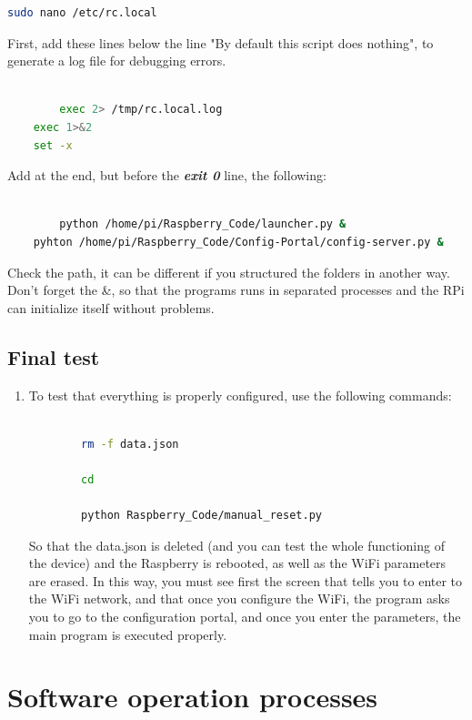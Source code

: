 \documentclass[12pt,a4paper,oneside]{article} %
\begin{document}
\begin{enumerate}
\begin{lstlisting}[language=sh]
		sudo nano /etc/rc.local 
	\end{lstlisting}
	
	First, add these lines below the line "By default this script does nothing", to generate a log file for debugging errors.
	\begin{lstlisting}[language=sh,style = textstyle]
	
		exec 2> /tmp/rc.local.log  
    exec 1>&2                  
    set -x  
	\end{lstlisting}
	
	Add at the end, but before the \textbf{\textit{exit 0}} line, the following: 
	\begin{lstlisting}[language=sh,style = textstyle]
	
		python /home/pi/Raspberry_Code/launcher.py & 
    pyhton /home/pi/Raspberry_Code/Config-Portal/config-server.py & 
	\end{lstlisting}
	
	 Check the path, it can be different if you structured the folders in another way. Don't forget the \&, so that the programs runs in separated processes and the RPi can initialize itself without problems.
\end{enumerate}

\subsection{Final test}

\begin{enumerate}
	\item To test that everything is properly configured, use the following commands:
	\begin{lstlisting}[language=sh]
	
		rm -f data.json
	
		cd
		
		python Raspberry_Code/manual_reset.py
	\end{lstlisting}
	So that the data.json is deleted (and you can test the whole functioning of the device) and the Raspberry is rebooted, as well as the WiFi parameters are erased.
In this way, you must see first the screen that tells you to enter to the WiFi network, and that once you configure the WiFi, the program asks you to go to the configuration portal, and once you enter the parameters, the main program is executed properly.
\end{enumerate}

\section{Software operation processes}
\end{document}
